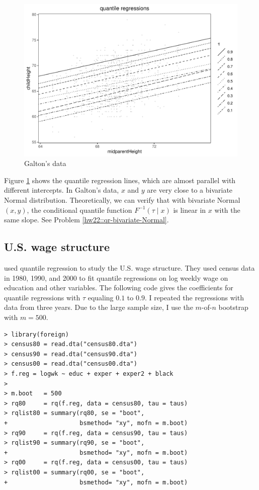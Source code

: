 \begin{figure}[th]
\centering
\includegraphics[width = 0.8 \textwidth]{figures/galton_qr.pdf}
\caption{Galton's data}\label{fig::galton-regression-quantiles}
\end{figure}


Figure \ref{fig::galton-regression-quantiles} shows the quantile regression lines, which are almost parallel with different intercepts. In Galton's data, $x$ and $y$ are very close to a bivariate Normal distribution. Theoretically, we can verify that with bivariate Normal $(x,y)$, the conditional quantile function $F^{-1}(\tau \mid x)$ is linear in $x$ with the same slope. See Problem \ref{hw22::qr-bivariate-Normal}. 





\subsection{U.S. wage structure}


\citet{angrist2006quantile} used quantile regression to study the U.S. wage structure. They used census data in 1980, 1990, and 2000 to fit quantile regressions on log weekly wage on education and other variables. The following code gives the coefficients for quantile regressions with $\tau$ equaling $0.1$ to $0.9$. I repeated the regressions with data from three years. Due to the large sample size, I use the $m$-of-$n$ bootstrap with $m=500$.


\begin{lstlisting}
> library(foreign)
> census80 = read.dta("census80.dta")
> census90 = read.dta("census90.dta")
> census00 = read.dta("census00.dta")
> f.reg = logwk ~ educ + exper + exper2 + black
> 
> m.boot   = 500       
> rq80     = rq(f.reg, data = census80, tau = taus)
> rqlist80 = summary(rq80, se = "boot", 
+                    bsmethod= "xy", mofn = m.boot)
> rq90     = rq(f.reg, data = census90, tau = taus)
> rqlist90 = summary(rq90, se = "boot", 
+                    bsmethod= "xy", mofn = m.boot)
> rq00     = rq(f.reg, data = census00, tau = taus)
> rqlist00 = summary(rq00, se = "boot", 
+                    bsmethod= "xy", mofn = m.boot)
\end{lstlisting}


